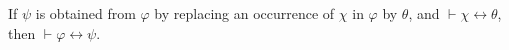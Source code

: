 If $\psi$ is obtained from $\varphi$ by replacing an occurrence of $\chi$ in $\varphi$ by $\theta$, and $\vdash \chi \leftrightarrow \theta$, then $\vdash \varphi \leftrightarrow \psi$.
